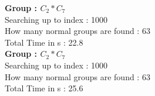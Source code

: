 \textbf{Group : $C_2*C_7$}\\
Searching up to index : 1000\\
How many normal groups are found : 63\\
Total Time in s : 22.8\\
\textbf{Group : $C_2*C_7$}\\
Searching up to index : 1000\\
How many normal groups are found : 63\\
Total Time in s : 25.6\\
